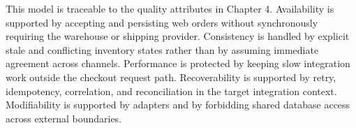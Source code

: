 This model is traceable to the quality attributes in Chapter 4. Availability is supported by
accepting and persisting web orders without synchronously requiring the warehouse or shipping
provider. Consistency is handled by explicit stale and conflicting inventory states rather than
by assuming immediate agreement across channels. Performance is protected by keeping slow
integration work outside the checkout request path. Recoverability is supported by retry,
idempotency, correlation, and reconciliation in the target integration context. Modifiability is
supported by adapters and by forbidding shared database access across external boundaries.

